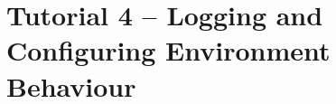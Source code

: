 \section{Tutorial 4 -- Logging and Configuring Environment Behaviour}

{
  \let\section\subsection
  \let\subsection\subsubsection
  \let\subsubsection\paragraph
  
  
  }


